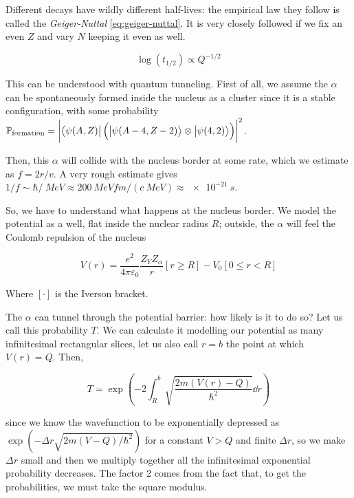 \documentclass[main.tex]{subfiles}
\begin{document}
Different decays have wildly different half-lives: the empirical law they follow is called the \emph{Geiger-Nuttal} \eqref{eq:geiger-nuttal}. It is very closely followed if we fix an even \(Z\) and vary \(N\) keeping it even as well.

\begin{equation} \label{eq:geiger-nuttal}
    \log(t_{1/2} ) \propto Q^{-1/2}
\end{equation}

This can be understood with quantum tunneling. First of all, we assume the \(\alpha\) can be spontaneously formed inside the nucleus as a cluster since it is a stable configuration, with some probability \(\mathbb{P} _ \text{formation} = \abs{\bra{\psi(A, Z)} \qty(\ket{\psi(A-4, Z-2)} \otimes \ket{\psi(4, 2)})}^2 \).

Then, this \(\alpha\) will collide with the nucleus border at some rate, which we estimate as \(f = 2 r / v\). A very rough estimate gives \(1/f \sim \hbar/\SI{}{MeV} \approx \SI{200}{MeVfm}/ (c\SI{}{MeV}) \approx \SI{e-21}{s} \).

So, we have to understand what happens at the nucleus border. We model the potential as a well, flat inside the nuclear radius \(R\); outside, the \(\alpha\) will feel the Coulomb repulsion of the nucleus

\begin{equation}
    V(r) = \frac{e^2}{4 \pi \varepsilon_0} \frac{Z_Y Z_\alpha}{r} [r \geq R] - V_0 [0 \leq r < R]
\end{equation}

Where \([\cdot]\) is the Iverson bracket.

The \(\alpha\) can tunnel through the potential barrier: how likely is it to do so? Let us call this probability \(T\). We can calculate it modelling our potential as many infinitesimal rectangular slices, let us also call \(r=b\) the point at which \(V(r) = Q\). Then,

\begin{equation}
    T = \exp(-2 \int _{R}   ^{b} \sqrt{\frac{2m(V(r) - Q)}{\hbar^2}}  \dd{r}  )
\end{equation}

since we know the wavefunction to be exponentially depressed as \(\exp(-\Delta r \sqrt{2m(V-Q)/\hbar^2} ) \) for a constant \(V>Q\) and finite \(\Delta r\), so we make \(\Delta r\) small and then we multiply together all the infinitesimal exponential probability decreases. The factor 2 comes from the fact that, to get the probabilities, we must take the square modulus.
\end{document}
